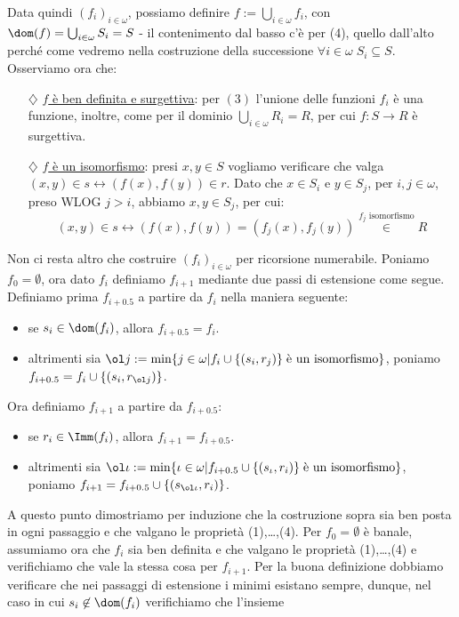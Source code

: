 \begin{soln}
\begin{itemize}
		Data quindi $(f_i)_{i \in \omega}$, possiamo definire $f := \bigcup_{i \in \omega} f_i$, con $\dom(f) = \bigcup_{i \in \omega} S_i = S$ - il contenimento dal basso c'è per (4), quello dall'alto perché come vedremo nella costruzione della successione $\forall i \in \omega \; S_i \subseteq S$.
		Osserviamo ora che:
		\begin{itemize}
			\item[$\diamondsuit$] \underline{$f$ è ben definita e surgettiva}: per $(3)$ l'unione delle funzioni $f_i$ è una funzione, inoltre, come per il dominio $\bigcup_{i \in \omega} R_i = R$, per cui $f : S \to R$ è surgettiva.
			\item[$\diamondsuit$] \underline{$f$ è un isomorfismo}: presi $x,y \in S$ vogliamo verificare che valga $(x,y) \in s \leftrightarrow (f(x),f(y)) \in r$. Dato che $x \in S_i$ e $y \in S_j$, per $i,j \in \omega$, preso WLOG $j > i$, abbiamo $x,y \in S_j$, per cui:
			\[ (x,y) \in s \leftrightarrow (f(x),f(y)) = (f_j(x),f_j(y)) \overset{\text{$f_j$ isomorfismo}}{\in} R
				\]
		\end{itemize}
		Non ci resta altro che costruire $(f_i)_{i \in \omega}$ per ricorsione numerabile. Poniamo $f_0 = \emptyset$, ora dato $f_i$ definiamo $f_{i + 1}$ mediante due passi di estensione come segue. Definiamo prima $f_{i + 0.5}$ a partire da $f_i$ nella maniera seguente:
		\begin{itemize}
			\item se $s_i \in \dom(f_i)$, allora $f_{i + 0.5} = f_i$.
			\item altrimenti sia $\ol j := \min\{j \in \omega | f_{i} \cup \{(s_i,r_j)\} \; \text{è un isomorfismo}\}$, poniamo $f_{i + 0.5} = f_{i} \cup \{(s_i,r_{\ol j})\}$.
		\end{itemize}
		Ora definiamo $f_{i+1}$ a partire da $f_{i + 0.5}$:
		\begin{itemize}
			\item se $r_i \in \Imm(f_i)$, allora $f_{i + 1} = f_{i + 0.5}$.
			\item altrimenti sia $\ol \iota := \min\{\iota \in \omega | f_{i + 0.5} \cup \{(s_\iota,r_i)\} \; \text{è un isomorfismo}\}$, poniamo $f_{i + 1} =f_{i + 0.5} \cup \{(s_{\ol \iota},r_i)\}$.
		\end{itemize}
		A questo punto dimostriamo per induzione che la costruzione sopra sia ben posta in ogni passaggio e che valgano le proprietà (1),\ldots,(4). Per $f_0 = \emptyset$ è banale, assumiamo ora che $f_i$ sia ben definita e che valgano le proprietà (1),\ldots,(4) e verifichiamo che 
		vale la stessa cosa per $f_{i + 1}$. Per la buona definizione dobbiamo verificare che nei passaggi di estensione i minimi esistano sempre, dunque, nel caso in cui $s_i \not \in \dom(f_i)$ verifichiamo che l'insieme 

\end{itemize}
\end{soln}
